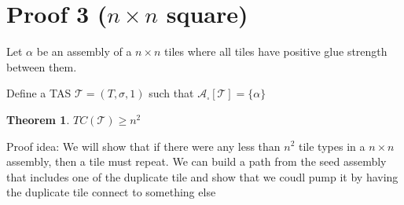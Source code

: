 \documentclass[12pt]{article}
\newtheorem{theorem}{Theorem}
\begin{document}
\section*{Proof 3 ($n \times n$ square)}

Let $\alpha$ be an assembly of a $n \times n$ tiles where all tiles have positive glue strength between them.

Define a TAS $\mathcal{T} = (T, \sigma, 1)$ such that $\mathcal{A}_\square[\mathcal{T}] = \{ \alpha \}$


\begin{theorem}
	$TC(\mathcal{T}) \geq n^2$
\end{theorem}

Proof idea: We will show that if there were any less than $n^2$ tile types in a $n \times n$ assembly, then a tile must repeat. We can build a path from the seed assembly that includes one of the duplicate tile and show that we coudl pump it by having the duplicate tile connect to something else
\end{document}
